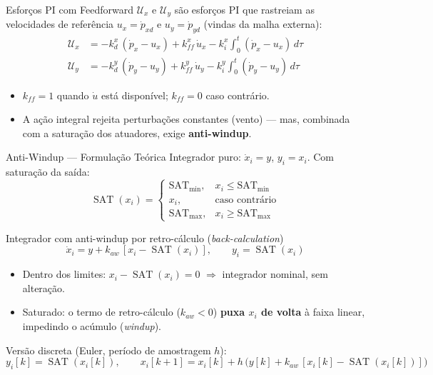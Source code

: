 \documentclass[aspectratio=169, 11pt]{beamer}
\begin{document}
\begin{frame}{ Esforços PI com Feedforward}
  $\mathcal{U}_x$ e $\mathcal{U}_y$ são esforços PI que rastreiam as
  velocidades de referência $u_x = \dot{p}_{xd}$ e $u_y = \dot{p}_{yd}$
  (vindas da malha externa):
  \begin{align}
    \mathcal{U}_x &= -k_d^x\,(\dot{p}_x - u_x) + k_{ff}^x\,\dot{u}_x
                     - k_i^x\!\int_0^t (\dot{p}_x - u_x)\,d\tau \\
    \mathcal{U}_y &= -k_d^y\,(\dot{p}_y - u_y) + k_{ff}^y\,\dot{u}_y
                     - k_i^y\!\int_0^t (\dot{p}_y - u_y)\,d\tau
  \end{align}
  \begin{itemize}
    \item $k_{ff} = 1$ quando $\dot{u}$ está disponível; $k_{ff} = 0$ caso contrário.
    \item A ação integral rejeita perturbações constantes (vento) —
          mas, combinada com a saturação dos atuadores, exige \textbf{anti-windup}.
  \end{itemize}
\end{frame}


\begin{frame}{Anti-Windup — Formulação Teórica}
  \footnotesize
  Integrador puro: $\dot{x}_i = y$, \; $y_i = x_i$. Com saturação da saída:
  \begin{equation}
    \operatorname{SAT}(x_i) =
    \begin{cases}
      \mathrm{SAT}_{\min}, & x_i \le \mathrm{SAT}_{\min} \\
      x_i,                 & \text{caso contrário} \\
      \mathrm{SAT}_{\max}, & x_i \ge \mathrm{SAT}_{\max}
    \end{cases}
  \end{equation}
  \begin{block}{Integrador com anti-windup por retro-cálculo (\emph{back-calculation})}
    \vspace{-0.4em}
    \begin{equation}
      \dot{x}_i = y + k_{aw}\,[x_i - \operatorname{SAT}(x_i)],
      \qquad
      y_i = \operatorname{SAT}(x_i)
    \end{equation}
    \vspace{-0.6em}
    \begin{itemize}
      \item Dentro dos limites: $x_i - \operatorname{SAT}(x_i) = 0$
            $\Rightarrow$ integrador nominal, sem alteração.
      \item Saturado: o termo de retro-cálculo ($k_{aw} < 0$) \textbf{puxa $x_i$
            de volta} à faixa linear, impedindo o acúmulo (\emph{windup}).
    \end{itemize}
  \end{block}
  Versão discreta (Euler, período de amostragem $h$):
  \begin{equation}
    y_i[k] = \operatorname{SAT}(x_i[k]),
    \qquad
    x_i[k+1] = x_i[k] + h\,\big(y[k] + k_{aw}\,[x_i[k] - \operatorname{SAT}(x_i[k])]\big)
  \end{equation}
\end{frame}
\end{document}
